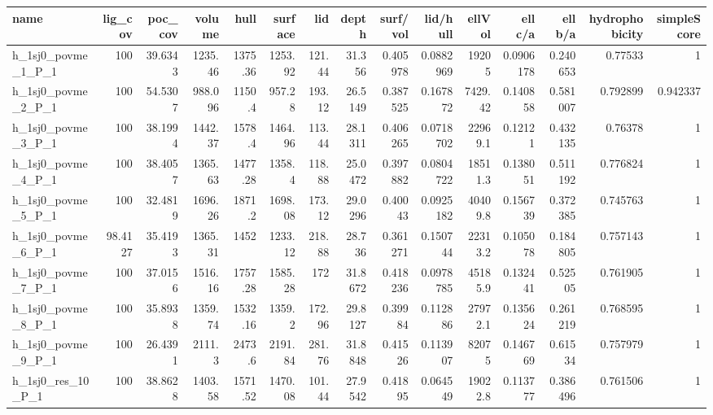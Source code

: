 \begin{tabular}{lrrrrrrrrrrrrrr}
\hline
 name               &   lig\_cov &   poc\_cov &   volume &    hull &   surface &    lid &   depth &   surf/vol &   lid/hull &   ellVol &   ell c/a &   ell b/a &   hydrophobicity &   simpleScore \\
\hline
 h\_1sj0\_povme\_1\_P\_1 &  100      &   39.6343 & 1235.46  & 1375.36 &   1253.92 & 121.44 & 31.356  &   0.405978 &  0.0882969 & 19205    & 0.0906178 &  0.240653 &         0.77533  &      1        \\
 h\_1sj0\_povme\_2\_P\_1 &  100      &   54.5307 &  988.096 & 1150.4  &    957.28 & 193.12 & 26.5149 &   0.387525 &  0.167872  &  7429.42 & 0.140858  &  0.581007 &         0.792899 &      0.942337 \\
 h\_1sj0\_povme\_3\_P\_1 &  100      &   38.1994 & 1442.37  & 1578.4  &   1464.96 & 113.44 & 28.1311 &   0.406265 &  0.0718702 & 22969.1  & 0.12121   &  0.432135 &         0.76378  &      1        \\
 h\_1sj0\_povme\_4\_P\_1 &  100      &   38.4057 & 1365.63  & 1477.28 &   1358.4  & 118.88 & 25.0472 &   0.397882 &  0.0804722 & 18511.3  & 0.138051  &  0.511192 &         0.776824 &      1        \\
 h\_1sj0\_povme\_5\_P\_1 &  100      &   32.4819 & 1696.26  & 1871.2  &   1698.08 & 173.12 & 29.0296 &   0.40043  &  0.0925182 & 40409.8  & 0.156739  &  0.372385 &         0.745763 &      1        \\
 h\_1sj0\_povme\_6\_P\_1 &   98.4127 &   35.4193 & 1365.31  & 1452    &   1233.12 & 218.88 & 28.736  &   0.361271 &  0.150744  & 22313.2  & 0.105078  &  0.184805 &         0.757143 &      1        \\
 h\_1sj0\_povme\_7\_P\_1 &  100      &   37.0156 & 1516.16  & 1757.28 &   1585.28 & 172    & 31.8672 &   0.418236 &  0.0978785 & 45185.9  & 0.132441  &  0.52505  &         0.761905 &      1        \\
 h\_1sj0\_povme\_8\_P\_1 &  100      &   35.8938 & 1359.74  & 1532.16 &   1359.2  & 172.96 & 29.8127 &   0.39984  &  0.112886  & 27972.1  & 0.135624  &  0.261219 &         0.768595 &      1        \\
 h\_1sj0\_povme\_9\_P\_1 &  100      &   26.4391 & 2111.3   & 2473.6  &   2191.84 & 281.76 & 31.8848 &   0.41526  &  0.113907  & 82075    & 0.146769  &  0.61534  &         0.757979 &      1        \\
 h\_1sj0\_res\_10\_P\_1  &  100      &   38.8628 & 1403.58  & 1571.52 &   1470.08 & 101.44 & 27.9542 &   0.41895  &  0.064549  & 19022.8  & 0.113777  &  0.386496 &         0.761506 &      1        \\
\hline
\end{tabular}